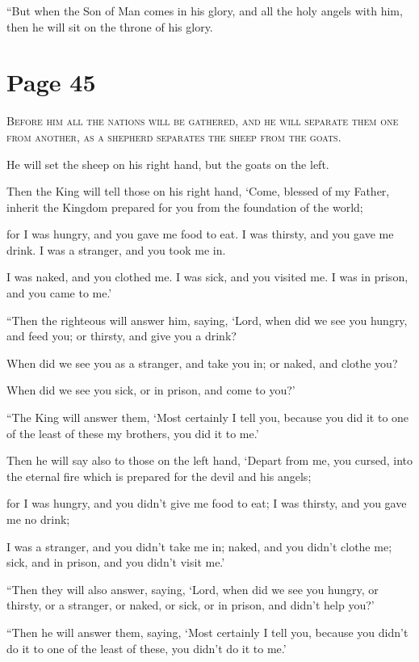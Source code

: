 “But when the Son of Man comes in his glory, and all the holy angels with him, then he will sit on the throne of his glory.



\chapterornament
\section*{Page 45}

\lettrine{B}{efore him all the nations will be gathered, and he will separate them one from another, as a shepherd separates the sheep from the goats.}

He will set the sheep on his right hand, but the goats on the left.

Then the King will tell those on his right hand, ‘Come, blessed of my Father, inherit the Kingdom prepared for you from the foundation of the world;

for I was hungry, and you gave me food to eat. I was thirsty, and you gave me drink. I was a stranger, and you took me in.

I was naked, and you clothed me. I was sick, and you visited me. I was in prison, and you came to me.’

“Then the righteous will answer him, saying, ‘Lord, when did we see you hungry, and feed you; or thirsty, and give you a drink?

When did we see you as a stranger, and take you in; or naked, and clothe you?

When did we see you sick, or in prison, and come to you?’

“The King will answer them, ‘Most certainly I tell you, because you did it to one of the least of these my brothers,  you did it to me.’

Then he will say also to those on the left hand, ‘Depart from me, you cursed, into the eternal fire which is prepared for the devil and his angels;

for I was hungry, and you didn’t give me food to eat; I was thirsty, and you gave me no drink;

I was a stranger, and you didn’t take me in; naked, and you didn’t clothe me; sick, and in prison, and you didn’t visit me.’

“Then they will also answer, saying, ‘Lord, when did we see you hungry, or thirsty, or a stranger, or naked, or sick, or in prison, and didn’t help you?’

“Then he will answer them, saying, ‘Most certainly I tell you, because you didn’t do it to one of the least of these, you didn’t do it to me.’

